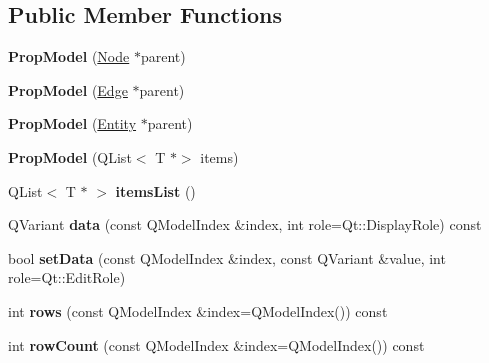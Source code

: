\subsection*{Public Member Functions}
\begin{DoxyCompactItemize}
\item 
\mbox{\label{class_prop_model_a0fd200289ce88fa4e44635f2a5867fef}} 
{\bfseries Prop\+Model} (\hyperlink{class_node}{Node} $\ast$parent)
\item 
\mbox{\label{class_prop_model_a67c22fe953dc06e5f50a428dda87997b}} 
{\bfseries Prop\+Model} (\hyperlink{class_edge}{Edge} $\ast$parent)
\item 
\mbox{\label{class_prop_model_aaf3a266b7f36e8e2cdd896de8274d66d}} 
{\bfseries Prop\+Model} (\hyperlink{class_entity}{Entity} $\ast$parent)
\item 
\mbox{\label{class_prop_model_ad7cf4ce6f6c0e64d756fffe69cc6bc5d}} 
{\bfseries Prop\+Model} (Q\+List$<$ T $\ast$$>$ items)
\item 
\mbox{\label{class_prop_model_a34bdcb9b51e397916cc665c65aeb6814}} 
Q\+List$<$ T $\ast$ $>$ {\bfseries items\+List} ()
\item 
\mbox{\label{class_prop_model_afa5cbc01067ad498eb139be457c7a13e}} 
Q\+Variant {\bfseries data} (const Q\+Model\+Index \&index, int role=Qt\+::\+Display\+Role) const
\item 
\mbox{\label{class_prop_model_a5dedd5a680557ee0e039790f67532e34}} 
bool {\bfseries set\+Data} (const Q\+Model\+Index \&index, const Q\+Variant \&value, int role=Qt\+::\+Edit\+Role)
\item 
\mbox{\label{class_prop_model_a85dfa91c6ca190c0ae199fd65daecbc4}} 
int {\bfseries rows} (const Q\+Model\+Index \&index=Q\+Model\+Index()) const
\item 
\mbox{\label{class_prop_model_ae13591f82708c811050c473aef287145}} 
int {\bfseries row\+Count} (const Q\+Model\+Index \&index=Q\+Model\+Index()) const
\item 
$$
\end{DoxyCompactItemize}
